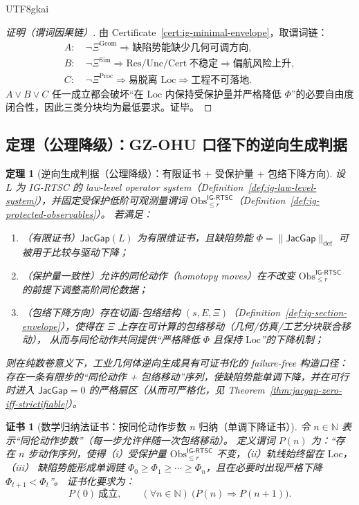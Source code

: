 \documentclass[12pt]{article}
\newtheorem{theorem}{定理}[section]
\newtheorem{certificate}{证书}[section]
\newcommand{\JacGap}{\ensuremath{\mathsf{JacGap}}}
\begin{document}
\begin{CJK*}{UTF8}{gkai}
\begin{proof}[证明（谓词因果链）]
由 Certificate~\ref{cert:ig-minimal-envelope}，取谓词链：
\[
\begin{aligned}
A:&\ \neg \Xi^{\mathrm{Geom}}\Rightarrow \text{缺陷势能缺少几何可调方向},\\
B:&\ \neg \Xi^{\mathrm{Sim}}\Rightarrow \mathrm{Res}/\mathrm{Unc}/\mathrm{Cert}\ \text{不稳定}\Rightarrow \text{偏航风险上升},\\
C:&\ \neg \Xi^{\mathrm{Proc}}\Rightarrow \text{易脱离 }\mathrm{Loc}\Rightarrow \text{工程不可落地}.
\end{aligned}
\]
$A\vee B\vee C$ 任一成立都会破坏“在 $\mathrm{Loc}$ 内保持受保护量并严格降低 $\Phi$”的必要自由度闭合性，因此三类分块均为最低要求。证毕。
\end{proof}

\subsection{定理（公理降级）：\textsf{GZ-OHU} 口径下的逆向生成判据}

\begin{theorem}[逆向生成判据（公理降级）：有限证书 + 受保护量 + 包络下降方向]
\label{thm:ig-invgen-ohu}
设 $L$ 为 \textsf{IG-RTSC} 的 law-level operator system（Definition~\ref{def:ig-law-level-system}），并固定受保护低阶可观测量谓词
  $\mathrm{Obs}_{\le r}^{\textsf{IG-RTSC}}$（Definition~\ref{def:ig-protected-observables}）。
若满足：
\begin{enumerate}
  \item（有限证书）$\JacGap(L)$ 为有限维证书，且缺陷势能 $\Phi=\|\JacGap\|_{\mathrm{def}}$ 可被用于比较与驱动下降；
  \item（保护量一致性）允许的同伦动作（homotopy moves）在不改变 $\mathrm{Obs}_{\le r}^{\textsf{IG-RTSC}}$ 的前提下调整高阶同伦数据；
  \item（包络下降方向）存在切面‑包络结构 $(s,E,\Xi)$（Definition~\ref{def:ig-section-envelope}），使得在 $\Xi$ 上存在可计算的包络移动（几何/仿真/工艺分块联合移动），
    从而与同伦动作共同提供“严格降低 $\Phi$ 且保持 $\mathrm{Loc}$”的下降机制；
\end{enumerate}
则在纯数卷意义下，工业几何体逆向生成具有可证书化的 failure-free 构造口径：存在一条有限步的“同伦动作 + 包络移动”序列，使缺陷势能单调下降，并在可行时进入 $\JacGap=0$ 的严格扇区（从而可严格化，见
  Theorem~\ref{thm:jacgap-zero-iff-strictifiable}）。
\end{theorem}

\begin{certificate}[数学归纳法证书：按同伦动作步数 $n$ 归纳（单调下降证书）]
\label{cert:ig-invgen-induction}
令 $n\in\mathbb{N}$ 表示“同伦动作步数”（每一步允许伴随一次包络移动）。
定义谓词 $P(n)$ 为：“存在 $n$ 步动作序列，使得（i）受保护量 $\mathrm{Obs}_{\le r}^{\textsf{IG-RTSC}}$ 不变，（ii）轨线始终留在 $\mathrm{Loc}$，（iii）
  缺陷势能形成单调链 $\Phi_0\ge \Phi_1\ge\cdots\ge \Phi_n$，且在必要时出现严格下降 $\Phi_{t+1}<\Phi_t$”。
证书化要求为：
\[
P(0)\ \text{成立},\qquad
(\forall n\in\mathbb{N})\ \bigl(P(n)\Rightarrow P(n+1)\bigr).
\]
\end{certificate}


\end{CJK*}
\end{document}
